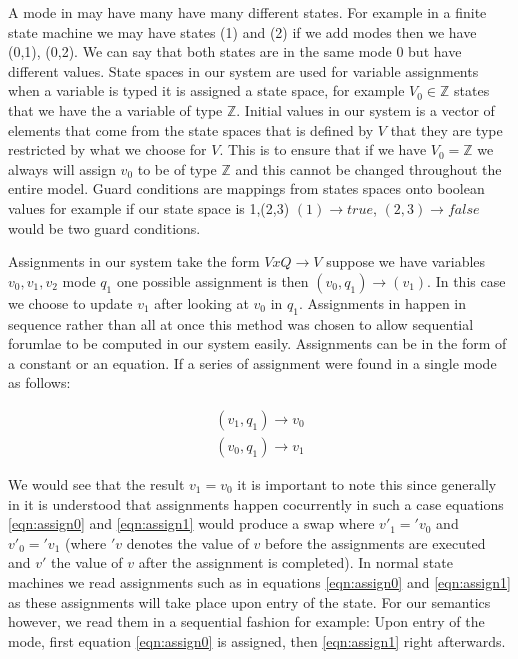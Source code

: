 A mode in \plccharts may have many have many different states. For example in a finite state machine we may have states (1) and (2) if we add modes then we have (0,1), (0,2). We can say that both states are in the same mode 0 but have different values. State spaces in our system are used for variable assignments when a variable is typed it is assigned a state space, for example $V_0 \in \mathbb{Z}$ states that we have the a variable of type $\mathbb{Z}$. Initial values in our system is a vector of elements that come from the state spaces that is defined by $V$ that they are type restricted by what we choose for $V$. This is to ensure that if we have $V_0 = \mathbb{Z}$ we always will assign $v_0$ to be of type $\mathbb{Z}$ and this cannot be changed throughout the entire model. Guard conditions are mappings from states spaces onto boolean values for example if our state space is {1,(2,3)} $(1) \rightarrow true$, $(2,3) \rightarrow false$ would be two guard conditions.

Assignments in our system take the form $V x Q \rightarrow V$ suppose we have variables $v_0,v_1,v_2$ mode $q_1$ one possible assignment is then $(v_0,q_1) \rightarrow (v_1)$. In this case we choose to update $v_1$ after looking at $v_0$ in $q_1$. Assignments in \plccharts happen in sequence rather than all at once this method was chosen to allow sequential forumlae to be computed in our system easily. Assignments can be in the form of a constant or an equation. If a series of assignment were found in a single mode as follows:


\begin{align}
(v_1,q_1) \rightarrow v_0 \label{eqn:assign0} \\ 
(v_0,q_1) \rightarrow v_1 \label{eqn:assign1}
\end{align}

We would see that the result $v_1 = v_0$ it is important to note this since generally in \cite{booth}  it is understood that assignments happen cocurrently in such a case equations \ref{eqn:assign0} and \ref{eqn:assign1} would produce a swap where $v'_1 = 'v_0$ and $v'_0 = 'v_1$ (where $'v$ denotes the value of $v$ before the assignments are executed and $v'$ the value of $v$ after the assignment is completed). In normal state machines we read assignments such as in equations \ref{eqn:assign0} and \ref{eqn:assign1} as these assignments will take place upon entry of the state. For our semantics however, we read them in a sequential fashion for example: Upon entry of the mode, first equation \ref{eqn:assign0} is assigned, then \ref{eqn:assign1} right afterwards.

